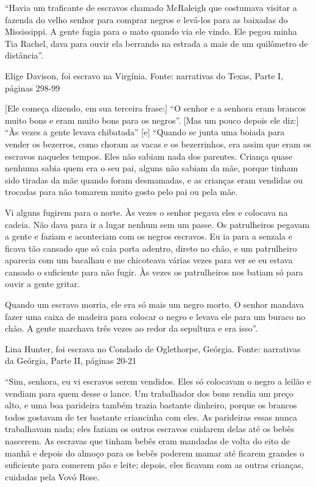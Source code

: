``Havia um traficante de escravos chamado McRaleigh que costumava
visitar a fazenda do velho senhor para comprar negros e levá-los para as
baixadas do Mississippi. A gente fugia para o mato quando via ele vindo.
Ele pegou minha Tia Rachel, dava para ouvir ela berrando na estrada a
mais de um quilômetro de distância''.

Elige Davison, foi escravo na Virgínia. Fonte: narrativas do Texas,
Parte I, páginas 298-99

{[}Ele começa dizendo, em sua terceira frase:{]} ``O senhor e a senhora
eram brancos muito bons e eram muito bons para os negros''. {[}Mas um
pouco depois ele diz:{]} ``Às vezes a gente levava chibatada'' {[}e{]}
``Quando se junta uma boiada para vender os bezerros, como choram as
vacas e os bezerrinhos, era assim que eram os escravos naqueles tempos.
Eles não sabiam nada dos parentes. Criança quase nenhuma sabia quem era
o seu pai, alguns não sabiam da mãe, porque tinham sido tiradas da mãe
quando foram desmamadas, e as crianças eram vendidas ou trocadas para
não tomarem muito gosto pelo pai ou pela mãe.

Vi alguns fugirem para o norte. Às vezes o senhor pegava eles e colocava
na cadeia. Não dava para ir a lugar nenhum sem um passe. Os patrulheiros
pegavam a gente e faziam e aconteciam com os negros escravos. Eu ia para
a senzala e ficava tão cansado que só caía porta adentro, direto no
chão, e um patrulheiro aparecia com um bacalhau e me chicoteava várias
vezes para ver se eu estava cansado o suficiente para não fugir. Às
vezes os patrulheiros nos batiam só para ouvir a gente gritar.

Quando um escravo morria, ele era só mais um negro morto. O senhor
mandava fazer uma caixa de madeira para colocar o negro e levava ele
para um buraco no chão. A gente marchava três vezes ao redor da
sepultura e era isso''.

Lina Hunter, foi escrava no Condado de Oglethorpe, Geórgia. Fonte:
narrativas da Geórgia, Parte II, páginas 20-21

``Sim, senhora, eu vi escravos serem vendidos. Eles só colocavam o negro
a leilão e vendiam para quem desse o lance. Um trabalhador dos bons
rendia um preço alto, e uma boa parideira também trazia bastante
dinheiro, porque os brancos todos gostavam de ter bastante criancinha
com eles. As parideiras essas nunca trabalhavam nada; eles faziam os
outros escravos cuidarem delas até os bebês nascerem. As escravas que
tinham bebês eram mandadas de volta do eito de manhã e depois do almoço
para os bebês poderem mamar até ficarem grandes o suficiente para
comerem pão e leite; depois, eles ficavam com as outras crianças,
cuidadas pela Vovó Rose.

